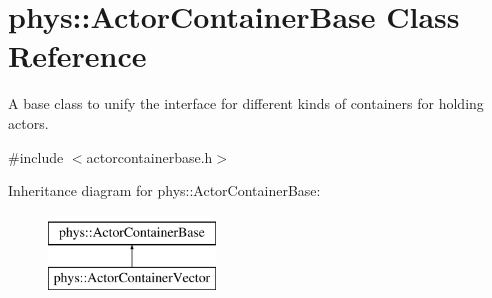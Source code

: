 \hypertarget{classphys_1_1ActorContainerBase}{
\section{phys::ActorContainerBase Class Reference}
\label{d1/d00/classphys_1_1ActorContainerBase}
}


A base class to unify the interface for different kinds of containers for holding actors.  




{\ttfamily \#include $<$actorcontainerbase.h$>$}

Inheritance diagram for phys::ActorContainerBase:\begin{figure}[H]
\begin{center}
\leavevmode
\includegraphics[height=2cm]{d1/d00/classphys_1_1ActorContainerBase}
\end{center}
\end{figure}
